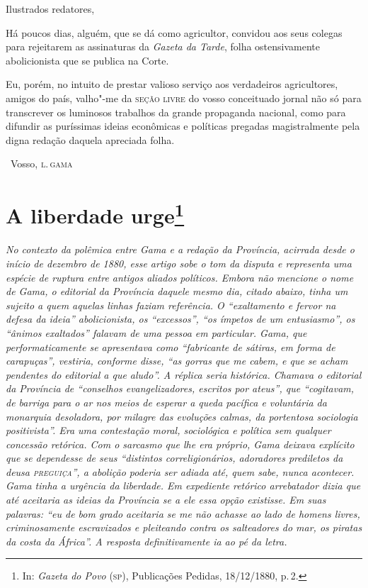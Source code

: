 \noindent{}Ilustrados redatores,

Há poucos dias, alguém, que se dá como agricultor, convidou aos seus
colegas para rejeitarem as assinaturas da \emph{Gazeta da Tarde}, folha
ostensivamente abolicionista que se publica na Corte.

Eu, porém, no intuito de prestar valioso serviço aos verdadeiros
agricultores, amigos do país, valho"-me da \textsc{seção livre} do vosso
conceituado jornal não só para transcrever os luminosos trabalhos da
grande propaganda nacional, como para difundir as puríssimas ideias
econômicas e políticas pregadas magistralmente pela digna redação
daquela apreciada folha.

\bigskip

\hfill\ Vosso, \textsc{l.\,gama}

\chapter{A liberdade urge\footnote[*]{In: \emph{Gazeta do Povo} (\textsc{sp}), Publicações Pedidas, 18/12/1880, p.\,2.}} 

\begin{flushleft}
{\footnotesize\itshape
No contexto da polêmica entre Gama e a redação da \emph{Província},
acirrada desde o início de dezembro de 1880, esse artigo sobe o tom da
disputa e representa uma espécie de ruptura entre antigos aliados
políticos. Embora não mencione o nome de Gama, o editorial da \emph{Província}
daquele mesmo dia, citado abaixo, tinha um sujeito
a quem aquelas linhas faziam referência. O
``exaltamento e fervor na defesa da ideia'' abolicionista, os ``excessos'',
``os ímpetos de um entusiasmo'', os ``ânimos exaltados'' falavam de uma
pessoa em particular. Gama, que performaticamente se apresentava como
``fabricante de sátiras, em forma de carapuças'', vestiria, conforme
disse, ``as gorras que me cabem, e que se acham pendentes do editorial a
que aludo''. A réplica seria histórica. Chamava o editorial da \emph{Província}
de ``conselhos evangelizadores, escritos por ateus'', que ``cogitavam, de
barriga para o ar nos meios de esperar a queda pacífica e voluntária da
monarquia desoladora, por milagre das evoluções calmas, da portentosa
sociologia positivista''. Era uma contestação moral, sociológica e
política sem qualquer concessão retórica. Com o sarcasmo que lhe era
próprio, Gama deixava explícito que se dependesse de seus ``distintos
correligionários, adoradores prediletos da deusa \textsc{preguiça}'', a abolição
poderia ser adiada até, quem sabe, nunca acontecer.
Gama tinha a urgência da liberdade. Em expediente retórico arrebatador
dizia que até aceitaria as ideias da \emph{Província} se a ele essa opção
existisse. Em suas palavras: ``eu de bom grado aceitaria se me não
achasse ao lado de homens livres, criminosamente escravizados e
pleiteando contra os salteadores do mar, os piratas da costa da África''.
A resposta definitivamente ia ao pé da letra. }
\end{flushleft}

